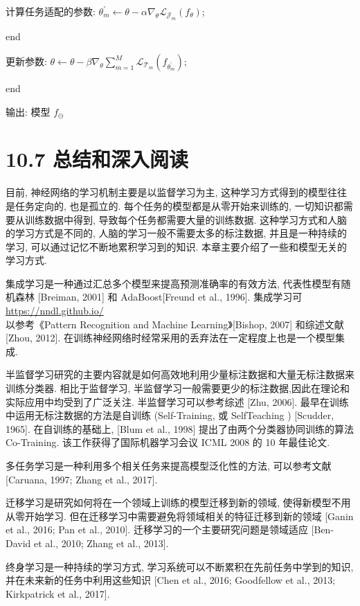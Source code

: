 \documentclass[10pt]{article}
\begin{document}
计算任务适配的参数: $\theta_{m}^{\prime} \leftarrow \theta-\alpha \nabla_{\theta} \mathcal{L}_{\mathcal{J}_{m}}\left(f_{\theta}\right)$;

end

更新参数: $\theta \leftarrow \theta-\beta \nabla_{\theta} \sum_{m=1}^{M} \mathcal{L}_{\mathcal{T}_{m}}\left(f_{\theta_{m}^{\prime}}\right)$;

end

输出: 模型 $f_{\ominus}$

\section*{10.7 总结和深入阅读}
目前, 神经网络的学习机制主要是以监督学习为主, 这种学习方式得到的模型往往是任务定向的, 也是孤立的. 每个任务的模型都是从零开始来训练的, 一切知识都需要从训练数据中得到, 导致每个任务都需要大量的训练数据. 这种学习方式和人脑的学习方式是不同的, 人脑的学习一般不需要太多的标注数据, 并且是一种持续的学习, 可以通过记忆不断地累积学习到的知识. 本章主要介绍了一些和模型无关的学习方式.

集成学习是一种通过汇总多个模型来提高预测准确率的有效方法, 代表性模型有随机森林 [Breiman, 2001] 和 AdaBoost[Freund et al., 1996]. 集成学习可 \href{https://nndl.github.io/}{https://nndl.github.io/}\\
以参考《Pattern Recognition and Machine Learning》[Bishop, 2007] 和综述文献 [Zhou, 2012]. 在训练神经网络时经常采用的丢弃法在一定程度上也是一个模型集成.

半监督学习研究的主要内容就是如何高效地利用少量标注数据和大量无标注数据来训练分类器. 相比于监督学习, 半监督学习一般需要更少的标注数据,因此在理论和实际应用中均受到了广泛关注. 半监督学习可以参考综述 [Zhu, 2006]. 最早在训练中运用无标注数据的方法是自训练 (Self-Training, 或 SelfTeaching ) [Scudder, 1965]. 在自训练的基础上, [Blum et al., 1998] 提出了由两个分类器协同训练的算法 Co-Training. 该工作获得了国际机器学习会议 ICML 2008 的 10 年最佳论文.

多任务学习是一种利用多个相关任务来提高模型泛化性的方法, 可以参考文献 [Caruana, 1997; Zhang et al., 2017].

迁移学习是研究如何将在一个领域上训练的模型迁移到新的领域, 使得新模型不用从零开始学习. 但在迁移学习中需要避免将领域相关的特征迁移到新的领域 [Ganin et al., 2016; Pan et al., 2010]. 迁移学习的一个主要研究问题是领域适应 [Ben-David et al., 2010; Zhang et al., 2013].

终身学习是一种持续的学习方式, 学习系统可以不断累积在先前任务中学到的知识, 并在未来新的任务中利用这些知识 [Chen et al., 2016; Goodfellow et al., 2013; Kirkpatrick et al., 2017].
\end{document}
